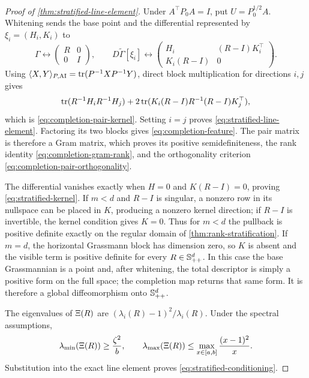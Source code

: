 \begin{proof}[Proof of \cref{thm:stratified-line-element}]
Under \(A^\top P_0A=I\), put \(U=P_0^{1/2}A\).  Whitening sends the base
point and the differential represented by \(\xi_i=(H_i,K_i)\) to
\[
  \Gamma\longleftrightarrow
  \begin{pmatrix}R&0\\0&I\end{pmatrix},
  \qquad
  D\widetilde\Gamma[\xi_i]\longleftrightarrow
  \begin{pmatrix}
    H_i&(R-I)K_i^\top\\
    K_i(R-I)&0
  \end{pmatrix}.
\]
Using
\(
\langle X,Y\rangle_{P,\mathrm{AI}}=\operatorname{tr}(P^{-1}XP^{-1}Y)
\), direct block multiplication for directions \(i,j\) gives
\[
  \operatorname{tr}(R^{-1}H_iR^{-1}H_j)
  +2\operatorname{tr}(K_i(R-I)R^{-1}(R-I)K_j^\top),
\]
which is \eqref{eq:completion-pair-kernel}.  Setting \(i=j\) proves
\eqref{eq:stratified-line-element}.  Factoring its two blocks gives
\eqref{eq:completion-feature}.  The pair matrix is therefore a Gram matrix,
which proves its positive semidefiniteness, the rank identity
\eqref{eq:completion-gram-rank}, and the orthogonality criterion
\eqref{eq:completion-pair-orthogonality}.

The differential vanishes exactly when \(H=0\) and \(K(R-I)=0\), proving
\eqref{eq:stratified-kernel}.  If \(m<d\) and \(R-I\) is singular, a nonzero
row in its nullspace can be placed in \(K\), producing a nonzero kernel
direction; if \(R-I\) is invertible, the kernel condition gives \(K=0\).
Thus for \(m<d\) the pullback is positive definite exactly on the regular
domain of \cref{thm:rank-stratification}.  If \(m=d\), the horizontal
Grassmann block has dimension zero, so \(K\) is absent and the visible term is
positive definite for every \(R\in\mathbb S_{++}^d\).  In this case the base
Grassmannian is a point and, after whitening, the total descriptor is simply a
positive form on the full space; the completion map returns that same form.
It is therefore a global diffeomorphism onto \(\mathbb S_{++}^d\).

The eigenvalues of \(\Xi(R)\) are
\((\lambda_i(R)-1)^2/\lambda_i(R)\).  Under the spectral assumptions,
\[
  \lambda_{\min}(\Xi(R))\ge\frac{\zeta^2}{b},
  \qquad
  \lambda_{\max}(\Xi(R))
  \le\max_{x\in[a,b]}\frac{(x-1)^2}{x}.
\]
Substitution into the exact line element proves
\eqref{eq:stratified-conditioning}.
\end{proof}

